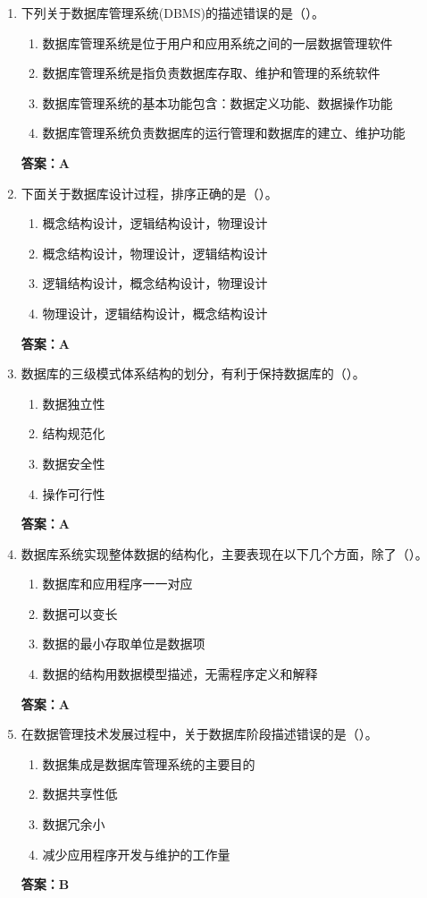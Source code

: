 \documentclass[12pt, a4paper]{article}
\begin{document}
\begin{enumerate}[label=\arabic*.]
	\item 下列关于数据库管理系统(DBMS)的描述错误的是（\quad）。
	      \begin{enumerate}
		      \item 数据库管理系统是位于用户和应用系统之间的一层数据管理软件
		      \item 数据库管理系统是指负责数据库存取、维护和管理的系统软件
		      \item 数据库管理系统的基本功能包含：数据定义功能、数据操作功能
		      \item 数据库管理系统负责数据库的运行管理和数据库的建立、维护功能
	      \end{enumerate}
	      \textbf{答案：A}

	\item 下面关于数据库设计过程，排序正确的是（\quad）。
	      \begin{enumerate}
		      \item 概念结构设计，逻辑结构设计，物理设计
		      \item 概念结构设计，物理设计，逻辑结构设计
		      \item 逻辑结构设计，概念结构设计，物理设计
		      \item 物理设计，逻辑结构设计，概念结构设计
	      \end{enumerate}
	      \textbf{答案：A}

	\item 数据库的三级模式体系结构的划分，有利于保持数据库的（\quad）。
	      \begin{enumerate}
		      \item 数据独立性
		      \item 结构规范化
		      \item 数据安全性
		      \item 操作可行性
	      \end{enumerate}
	      \textbf{答案：A}

	\item 数据库系统实现整体数据的结构化，主要表现在以下几个方面，除了（\quad）。
	      \begin{enumerate}
		      \item 数据库和应用程序一一对应
		      \item 数据可以变长
		      \item 数据的最小存取单位是数据项
		      \item 数据的结构用数据模型描述，无需程序定义和解释
	      \end{enumerate}
	      \textbf{答案：A}

	\item 在数据管理技术发展过程中，关于数据库阶段描述错误的是（\quad）。
	      \begin{enumerate}
		      \item 数据集成是数据库管理系统的主要目的
		      \item 数据共享性低
		      \item 数据冗余小
		      \item 减少应用程序开发与维护的工作量
	      \end{enumerate}
	      \textbf{答案：B}
\end{enumerate}
\end{document}
